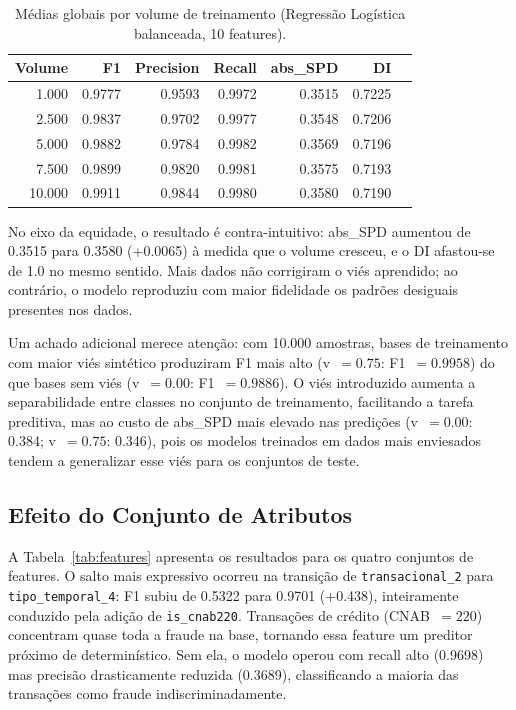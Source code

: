 \begin{table}[H]
\centering
\caption{Médias globais por volume de treinamento (Regressão Logística
balanceada, 10 features).}
\label{tab:volume}
\begin{tabular}{rrrrrrr}
\toprule
\textbf{Volume} & \textbf{F1} & \textbf{Precision} & \textbf{Recall}
  & \textbf{abs\_SPD} & \textbf{DI} \\
\midrule
1.000  & 0.9777 & 0.9593 & 0.9972 & 0.3515 & 0.7225 \\
2.500  & 0.9837 & 0.9702 & 0.9977 & 0.3548 & 0.7206 \\
5.000  & 0.9882 & 0.9784 & 0.9982 & 0.3569 & 0.7196 \\
7.500  & 0.9899 & 0.9820 & 0.9981 & 0.3575 & 0.7193 \\
10.000 & 0.9911 & 0.9844 & 0.9980 & 0.3580 & 0.7190 \\
\bottomrule
\end{tabular}
\end{table}

No eixo da equidade, o resultado é contra-intuitivo: abs\_SPD aumentou de 0.3515 para 0.3580 (+0.0065) à medida que o volume cresceu, e o DI afastou-se de 1.0 no mesmo sentido. Mais dados não corrigiram o viés aprendido; ao contrário, o modelo reproduziu com maior fidelidade os padrões desiguais presentes nos dados. 

Um achado adicional merece atenção: com 10.000 amostras, bases de treinamento com maior viés sintético produziram F1 mais alto (v~$= 0.75$: F1~$= 0.9958$) do que bases sem viés (v~$= 0.00$: F1~$= 0.9886$). O viés introduzido aumenta a separabilidade entre classes no conjunto de treinamento, facilitando a tarefa preditiva, mas ao custo de abs\_SPD mais elevado nas predições (v~$= 0.00$: 0.384; v~$= 0.75$: 0.346), pois os modelos treinados em dados mais enviesados tendem a generalizar esse viés para os conjuntos de teste.

\subsection{Efeito do Conjunto de Atributos}
\label{sec:features}

A Tabela~\ref{tab:features} apresenta os resultados para os quatro conjuntos de features. O salto mais expressivo ocorreu na transição de \texttt{transacional\_2} para \texttt{tipo\_temporal\_4}: F1 subiu de 0.5322 para 0.9701 (+0.438), inteiramente conduzido pela adição de \texttt{is\_cnab220}. Transações de crédito (CNAB~$= 220$) concentram quase toda a fraude na base, tornando essa feature um preditor próximo de determinístico. Sem ela, o modelo operou com recall alto (0.9698) mas precisão drasticamente reduzida (0.3689), classificando a maioria das transações como fraude indiscriminadamente.

